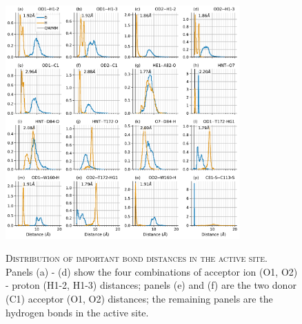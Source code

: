 \begin{figure}
    \centering
    \caption[Distribution of important bond distances in the active site]{\textsc{Distribution of important bond distances in the active site}. Panels (a) - (d) show the four combinations of acceptor ion (O1, O2) - proton (H1-2, H1-3) distances; panels (e) and (f) are the two donor (C1) acceptor (O1, O2) distances; the remaining panels are the hydrogen bonds in the active site.}
    \includegraphics[width=0.8\textwidth]{chapters/aadh/figures/bond_distances_dist.pdf}
    \label{fig:bond_dist}
\end{figure}

